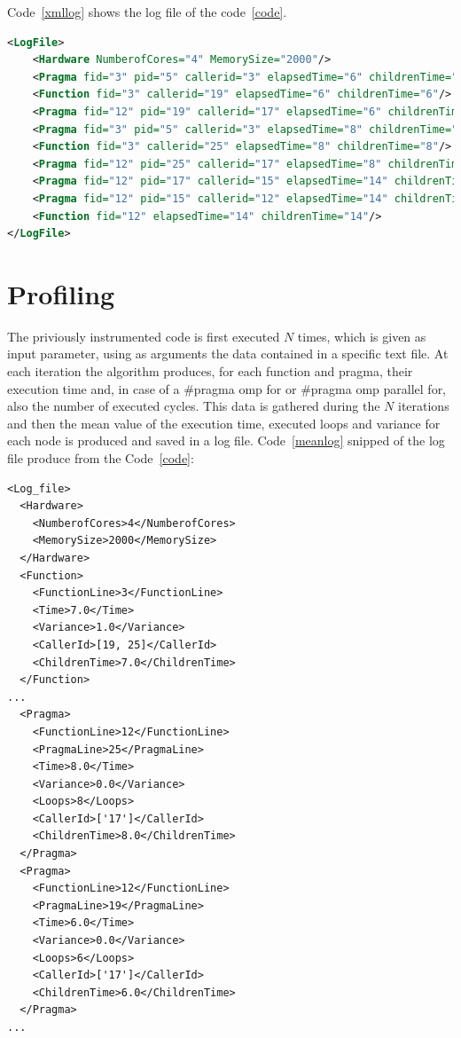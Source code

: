 \documentclass[a4paper,12pt,oneside]{book}
\begin{document}
Code~\ref{xmllog} shows the log file of the code~\ref{code}.

\begin{lstlisting}[language=XML, caption=XML file of the pragma structure of Code~\ref{code}., label=xmllog]
<LogFile>
	<Hardware NumberofCores="4" MemorySize="2000"/>
	<Pragma fid="3" pid="5" callerid="3" elapsedTime="6" childrenTime="0" loops="6"/>
	<Function fid="3" callerid="19" elapsedTime="6" childrenTime="6"/>
	<Pragma fid="12" pid="19" callerid="17" elapsedTime="6" childrenTime="6"/>
	<Pragma fid="3" pid="5" callerid="3" elapsedTime="8" childrenTime="0" loops="8"/>
	<Function fid="3" callerid="25" elapsedTime="8" childrenTime="8"/>
	<Pragma fid="12" pid="25" callerid="17" elapsedTime="8" childrenTime="8"/>
	<Pragma fid="12" pid="17" callerid="15" elapsedTime="14" childrenTime="14"/>
	<Pragma fid="12" pid="15" callerid="12" elapsedTime="14" childrenTime="14"/>
	<Function fid="12" elapsedTime="14" childrenTime="14"/>
</LogFile>
\end{lstlisting}


\section{Profiling}

The priviously instrumented code is first executed $N$ times, which is given as input parameter, using as arguments the data contained in a specific text file. At each iteration the algorithm produces, for each function and pragma, their execution time and, in case of a $\#$pragma omp for or $\#$pragma omp parallel for, also the number of executed cycles. This data is gathered during the $N$ iterations and then the mean value of the execution time, executed loops and variance for each node is produced and saved in a log file. 
Code~\ref{meanlog} snipped of the log file produce from the Code~\ref{code}:

\lstset{language=XML}
\begin{lstlisting}[caption=Profile XML file, label=meanlog]
<Log_file>
  <Hardware>
    <NumberofCores>4</NumberofCores>
    <MemorySize>2000</MemorySize>
  </Hardware>
  <Function>
    <FunctionLine>3</FunctionLine>
    <Time>7.0</Time>
    <Variance>1.0</Variance>
    <CallerId>[19, 25]</CallerId>
    <ChildrenTime>7.0</ChildrenTime>
  </Function>
...
  <Pragma>
    <FunctionLine>12</FunctionLine>
    <PragmaLine>25</PragmaLine>
    <Time>8.0</Time>
    <Variance>0.0</Variance>
    <Loops>8</Loops>
    <CallerId>['17']</CallerId>
    <ChildrenTime>8.0</ChildrenTime>
  </Pragma>
  <Pragma>
    <FunctionLine>12</FunctionLine>
    <PragmaLine>19</PragmaLine>
    <Time>6.0</Time>
    <Variance>0.0</Variance>
    <Loops>6</Loops>
    <CallerId>['17']</CallerId>
    <ChildrenTime>6.0</ChildrenTime>
  </Pragma>
...
\end{lstlisting}
\end{document}
